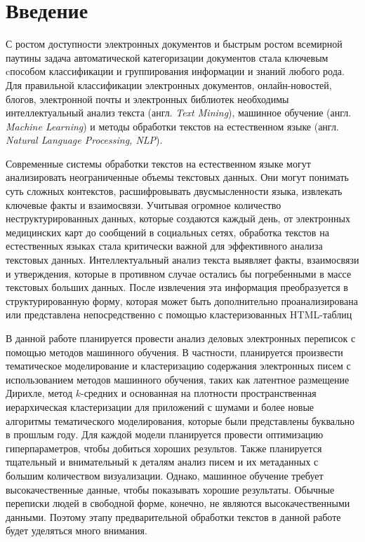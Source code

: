 \chapter*{Введение}

С ростом доступности электронных документов и быстрым ростом всемирной паутины задача автоматической категоризации документов стала ключевым cпособом классификации и группирования информации и знаний любого рода. Для правильной классификации электронных документов, онлайн-новостей, блогов, электронной почты и электронных библиотек необходимы интеллектуальный анализ текста (англ. \textit{Text Mining}), машинное обучение (англ. \textit{Machine Learning}) и методы обработки текстов на естественном языке (англ. \textit{Natural Language Processing, NLP}).

Современные системы обработки текстов на естественном языке
могут анализировать неограниченные объемы текстовых данных. Они могут понимать суть сложных контекстов, расшифровывать двусмысленности языка, извлекать ключевые факты и взаимосвязи. Учитывая огромное количество неструктурированных данных, которые создаются каждый день, от электронных медицинских карт до сообщений в социальных сетях, обработка текстов на естественных языках стала критически важной для эффективного анализа текстовых данных.
Интеллектуальный анализ текста выявляет факты, взаимосвязи и утверждения, которые в противном случае остались бы погребенными в массе текстовых больших данных. После извлечения эта информация преобразуется в структурированную форму, которая может быть дополнительно проанализирована или представлена непосредственно с помощью кластеризованных HTML-таблиц

В данной работе планируется провести анализ деловых электронных переписок с помощью методов машинного обучения. В частности, планируется произвести тематическое моделирование и кластеризацию содержания электронных писем с использованием методов машинного обучения, таких как латентное размещение Дирихле, метод $k$-средних и основанная на плотности пространственная иерархическая кластеризации для приложений с шумами и более 
новые алгоритмы тематического моделирования, которые были представлены буквально в прошлым году. Для каждой модели планируется провести оптимизацию гиперпараметров, чтобы добиться хороших результов. Также планируется тщательный и внимательный к деталям анализ писем и их метаданных с большим количеством визуализации. Однако, машинное обучение требует высокачественные данные, чтобы показывать хорошие результаты. Обычные переписки людей в свободной форме, конечно, не являются высокачественными данными. Поэтому этапу предварительной обработки текстов в данной работе будет уделяться много внимания.

\clearpage
